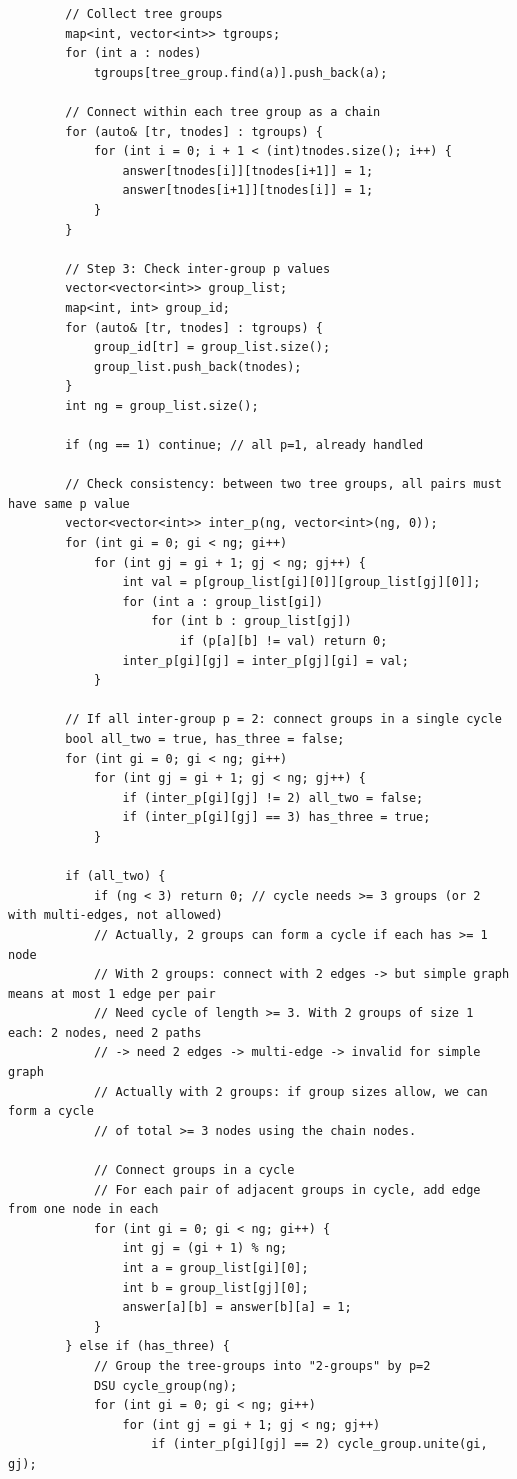 \documentclass[11pt,a4paper]{article}
\begin{document}
\begin{lstlisting}
        // Collect tree groups
        map<int, vector<int>> tgroups;
        for (int a : nodes)
            tgroups[tree_group.find(a)].push_back(a);

        // Connect within each tree group as a chain
        for (auto& [tr, tnodes] : tgroups) {
            for (int i = 0; i + 1 < (int)tnodes.size(); i++) {
                answer[tnodes[i]][tnodes[i+1]] = 1;
                answer[tnodes[i+1]][tnodes[i]] = 1;
            }
        }

        // Step 3: Check inter-group p values
        vector<vector<int>> group_list;
        map<int, int> group_id;
        for (auto& [tr, tnodes] : tgroups) {
            group_id[tr] = group_list.size();
            group_list.push_back(tnodes);
        }
        int ng = group_list.size();

        if (ng == 1) continue; // all p=1, already handled

        // Check consistency: between two tree groups, all pairs must have same p value
        vector<vector<int>> inter_p(ng, vector<int>(ng, 0));
        for (int gi = 0; gi < ng; gi++)
            for (int gj = gi + 1; gj < ng; gj++) {
                int val = p[group_list[gi][0]][group_list[gj][0]];
                for (int a : group_list[gi])
                    for (int b : group_list[gj])
                        if (p[a][b] != val) return 0;
                inter_p[gi][gj] = inter_p[gj][gi] = val;
            }

        // If all inter-group p = 2: connect groups in a single cycle
        bool all_two = true, has_three = false;
        for (int gi = 0; gi < ng; gi++)
            for (int gj = gi + 1; gj < ng; gj++) {
                if (inter_p[gi][gj] != 2) all_two = false;
                if (inter_p[gi][gj] == 3) has_three = true;
            }

        if (all_two) {
            if (ng < 3) return 0; // cycle needs >= 3 groups (or 2 with multi-edges, not allowed)
            // Actually, 2 groups can form a cycle if each has >= 1 node
            // With 2 groups: connect with 2 edges -> but simple graph means at most 1 edge per pair
            // Need cycle of length >= 3. With 2 groups of size 1 each: 2 nodes, need 2 paths
            // -> need 2 edges -> multi-edge -> invalid for simple graph
            // Actually with 2 groups: if group sizes allow, we can form a cycle
            // of total >= 3 nodes using the chain nodes.

            // Connect groups in a cycle
            // For each pair of adjacent groups in cycle, add edge from one node in each
            for (int gi = 0; gi < ng; gi++) {
                int gj = (gi + 1) % ng;
                int a = group_list[gi][0];
                int b = group_list[gj][0];
                answer[a][b] = answer[b][a] = 1;
            }
        } else if (has_three) {
            // Group the tree-groups into "2-groups" by p=2
            DSU cycle_group(ng);
            for (int gi = 0; gi < ng; gi++)
                for (int gj = gi + 1; gj < ng; gj++)
                    if (inter_p[gi][gj] == 2) cycle_group.unite(gi, gj);


\end{lstlisting}
\end{document}
